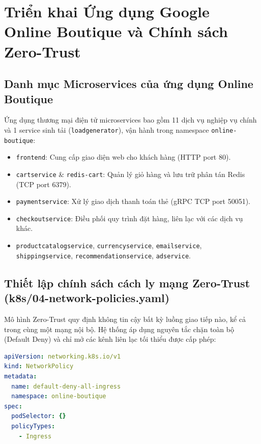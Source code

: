 \section{Triển khai Ứng dụng Google Online Boutique và Chính sách Zero-Trust}

\subsection{Danh mục Microservices của ứng dụng Online Boutique}
Ứng dụng thương mại điện tử microservices bao gồm 11 dịch vụ nghiệp vụ chính và 1 service sinh tải (\texttt{loadgenerator}), vận hành trong namespace \texttt{online-boutique}:
\begin{itemize}
    \item \texttt{frontend}: Cung cấp giao diện web cho khách hàng (HTTP port 80).
    \item \texttt{cartservice} \& \texttt{redis-cart}: Quản lý giỏ hàng và lưu trữ phân tán Redis (TCP port 6379).
    \item \texttt{paymentservice}: Xử lý giao dịch thanh toán thẻ (gRPC TCP port 50051).
    \item \texttt{checkoutservice}: Điều phối quy trình đặt hàng, liên lạc với các dịch vụ khác.
    \item \texttt{productcatalogservice}, \texttt{currencyservice}, \texttt{emailservice}, \texttt{shippingservice}, \texttt{recommendationservice}, \texttt{adservice}.
\end{itemize}

\subsection{Thiết lập chính sách cách ly mạng Zero-Trust (k8s/04-network-policies.yaml)}
Mô hình Zero-Trust quy định không tin cậy bất kỳ luồng giao tiếp nào, kể cả trong cùng một mạng nội bộ. Hệ thống áp dụng nguyên tắc chặn toàn bộ (Default Deny) và chỉ mở các kênh liên lạc tối thiểu được cấp phép:

\begin{lstlisting}[language=yaml, caption={Chính sách Default Deny toàn bộ Inbound trong namespace online-boutique}]
apiVersion: networking.k8s.io/v1
kind: NetworkPolicy
metadata:
  name: default-deny-all-ingress
  namespace: online-boutique
spec:
  podSelector: {}
  policyTypes:
    - Ingress
\end{lstlisting}

